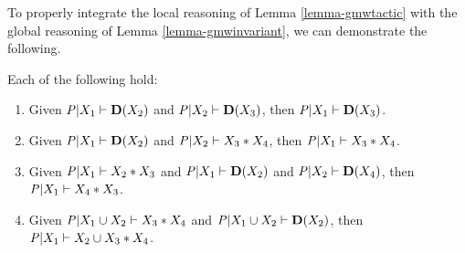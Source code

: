 To properly integrate the local reasoning of Lemma \ref{lemma-gmwtactic} with
the global reasoning of Lemma \ref{lemma-gmwinvariant}, we can demonstrate
the following.
\begin{lemma}
  \label{lemma-conditioning}
  Each of the following hold:
  \begin{enumerate}
    \item Given $\mathit{P}|X_1 \vdash \mathbf{D}(X_2)$ and
      $\mathit{P}|X_2 \vdash \mathbf{D}(X_3)$, then $\mathit{P}|X_1 \vdash \mathbf{D}(X_3)$.
    \item Given $\mathit{P}|X_1 \vdash \mathbf{D}(X_2)$ and
      $\mathit{P}|X_2 \vdash X_3 * X_4$, then $\mathit{P}|X_1 \vdash X_3 * X_4$.
    \item Given $\mathit{P}|X_1 \vdash X_2 * X_3$ and $\mathit{P}|X_1 \vdash \mathbf{D}(X_2)$
      and $\mathit{P}|X_2 \vdash \mathbf{D}(X_4)$, then $\mathit{P}|X_1 \vdash X_4 * X_3$.
    \item Given $\mathit{P}|X_1 \cup X_2 \vdash X_3 * X_4$ and $\mathit{P}|X_1 \cup X_2 \vdash \mathbf{D}(X_2)$,
      then $\mathit{P}|X_1 \vdash X_2 \cup X_3 * X_4$.
  \end{enumerate}
\end{lemma}


